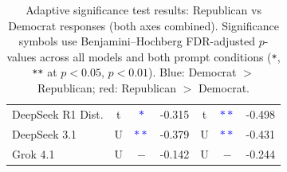 \begin{table}[h]
{\begin{tabular}{@{}l|ccc|ccc@{}}
        \cellcolor{purple!10}DeepSeek R1 Dist. & \cellcolor{purple!10}t & \cellcolor{purple!10}\textcolor{blue}{$\ast$} & \cellcolor{purple!10}-0.315 & \cellcolor{purple!10}t & \cellcolor{purple!10}\textcolor{blue}{$\ast\ast$} & \cellcolor{purple!10}-0.498 \\
        \cellcolor{purple!50!black!10}DeepSeek 3.1 & \cellcolor{purple!50!black!10}U & \cellcolor{purple!50!black!10}\textcolor{blue}{$\ast\ast$} & \cellcolor{purple!50!black!10}-0.379 & \cellcolor{purple!50!black!10}U & \cellcolor{purple!50!black!10}\textcolor{blue}{$\ast\ast$} & \cellcolor{purple!50!black!10}-0.431 \\
        \cellcolor{orange!10}Grok 4.1 & \cellcolor{orange!10}U & \cellcolor{orange!10}$-$ & \cellcolor{orange!10}-0.142 & \cellcolor{orange!10}U & \cellcolor{orange!10}$-$ & \cellcolor{orange!10}-0.244 \\

            \bottomrule
        \end{tabular}
        \caption{Adaptive significance test results: Republican vs Democrat responses (both axes combined). Significance symbols use Benjamini--Hochberg FDR-adjusted $p$-values across all models and both prompt conditions (\texttt{*}, \texttt{**} at $p<0.05$, $p<0.01$). Blue: Democrat $>$ Republican; red: Republican $>$ Democrat.}
        \label{tab:pbt_small}
        }
    \end{table}
    